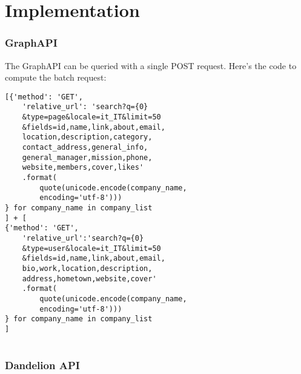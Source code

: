 \chapter{Implementation} 

\subsection{GraphAPI}

The GraphAPI can be queried with a single POST request.
Here's the code to compute the batch request:

\begin{verbatim}
[{'method': 'GET',
    'relative_url': 'search?q={0}
    &type=page&locale=it_IT&limit=50
    &fields=id,name,link,about,email,
    location,description,category,
    contact_address,general_info,
    general_manager,mission,phone,
    website,members,cover,likes'
    .format(
        quote(unicode.encode(company_name,
        encoding='utf-8')))
} for company_name in company_list
] + [
{'method': 'GET',
    'relative_url':'search?q={0}
    &type=user&locale=it_IT&limit=50
    &fields=id,name,link,about,email,
    bio,work,location,description,
    address,hometown,website,cover'
    .format(
        quote(unicode.encode(company_name,
        encoding='utf-8')))
} for company_name in company_list
]
        
\end{verbatim}

\subsection{Dandelion API}

